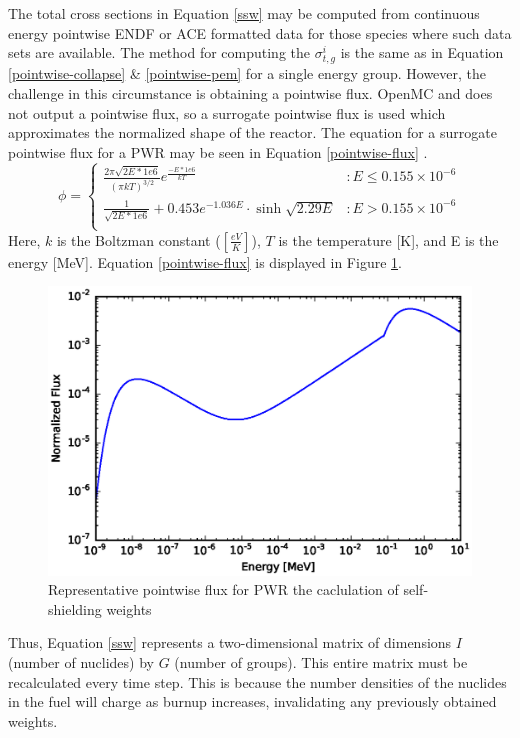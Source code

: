\documentclass{article}
\begin{document}
The total cross sections in Equation \ref{ssw} may be computed from continuous energy
pointwise ENDF or ACE formatted data for those species where such data sets are available.
The method for computing the  $\sigma_{t,g}^i$ is the same as in Equation
\ref{pointwise-collapse} \& \ref{pointwise-pem} for a single energy group.  However,
the challenge in this circumstance is obtaining a pointwise flux. OpenMC and does not output
a pointwise flux, so a surrogate pointwise flux is used which approximates the normalized shape
of the reactor. The equation for a surrogate pointwise flux for a PWR may be seen in
Equation \ref{pointwise-flux} \cite{spectrum}.
\begin{equation}
\label{pointwise-flux}
\phi =
\begin{cases}
    \frac{2\pi\sqrt{2E*1e6}}{(\pi kT)^{3/2}}e^{\frac{-E*1e6}{kT}} & : E\leq 0.155\times 10^{-6} \\
    \frac{1}{\sqrt{2E*1e6}} + 0.453e^{-1.036E}\cdot\sinh{\sqrt{2.29E}} & : E > 0.155\times 10^{-6} \\
\end{cases}
\end{equation}
Here, $k$ is the Boltzman constant ($[\frac{eV}{K}]$), $T$ is the temperature [K],
and E is the energy [MeV]. Equation \ref{pointwise-flux} is displayed in
Figure \ref{fig:therm}.
\begin{figure}[h]
  \center
  \includegraphics[scale=0.6]{thermspec.eps}
  \caption{Representative pointwise flux for PWR the caclulation of self-shielding weights}
  \label{fig:therm}
\end{figure}

Thus, Equation \ref{ssw} represents a two-dimensional matrix of dimensions
$I$ (number of nuclides) by $G$ (number of groups). This entire matrix 
must be recalculated every time step. This is because the number densities of the nuclides
in the fuel will charge as burnup increases, invalidating any previously obtained weights.
\end{document}
